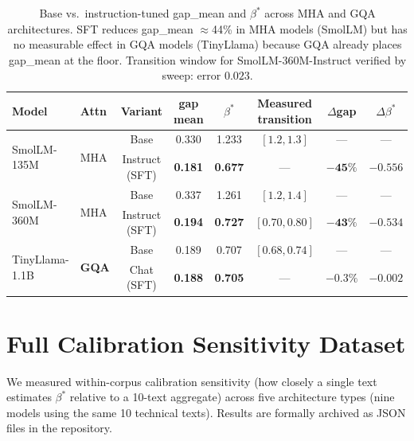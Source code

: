 \documentclass{article}
\begin{document}
\begin{table}[h]
\centering
\caption{Base vs.\ instruction-tuned gap\_mean and $\beta^*$ across MHA and GQA architectures. SFT reduces gap\_mean $\approx$44\% in MHA models (SmolLM) but has no measurable effect in GQA models (TinyLlama) because GQA already places gap\_mean at the floor. Transition window for SmolLM-360M-Instruct verified by sweep: error $0.023$.}
\begin{tabular}{llcccccc}
\toprule
Model & Attn & Variant & gap mean & $\beta^*$ & Measured transition & $\Delta$gap & $\Delta\beta^*$ \\
\midrule
\multirow{2}{*}{SmolLM-135M} & \multirow{2}{*}{MHA} & Base & 0.330 & 1.233 & $[1.2, 1.3]$ & --- & --- \\
 & & Instruct (SFT) & \textbf{0.181} & \textbf{0.677} & --- & $\mathbf{-45\%}$ & $-0.556$ \\
\midrule
\multirow{2}{*}{SmolLM-360M} & \multirow{2}{*}{MHA} & Base & 0.337 & 1.261 & $[1.2, 1.4]$ & --- & --- \\
 & & Instruct (SFT) & \textbf{0.194} & \textbf{0.727} & $[0.70, 0.80]$ & $\mathbf{-43\%}$ & $-0.534$ \\
\midrule
\multirow{2}{*}{TinyLlama-1.1B} & \multirow{2}{*}{\textbf{GQA}} & Base & 0.189 & 0.707 & $[0.68, 0.74]$ & --- & --- \\
 & & Chat (SFT) & \textbf{0.188} & \textbf{0.705} & --- & $\mathbf{-0.3\%}$ & $-0.002$ \\
\bottomrule
\end{tabular}
\label{tab:instruct}
\end{table}

\section{Full Calibration Sensitivity Dataset}
\label{app:sensitivity}

We measured within-corpus calibration sensitivity (how closely a single text estimates $\beta^*$ relative to a 10-text aggregate) across five architecture types (nine models using the same 10 technical texts). Results are formally archived as JSON files in the repository.
\end{document}
